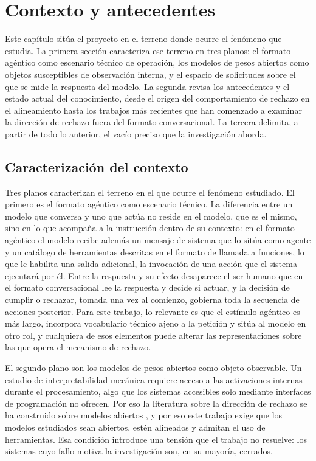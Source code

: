 \chapter{Contexto y antecedentes}
\label{chap:contexto-antecedentes}

Este capítulo sitúa el proyecto en el terreno donde ocurre el fenómeno que
estudia. La primera sección caracteriza ese terreno en tres planos: el
formato agéntico como escenario técnico de operación, los modelos de pesos
abiertos como objetos susceptibles de observación interna, y el espacio de
solicitudes sobre el que se mide la respuesta del modelo. La segunda revisa
los antecedentes y el estado actual del conocimiento, desde el origen del
comportamiento de rechazo en el alineamiento hasta los trabajos más
recientes que han comenzado a examinar la dirección de rechazo fuera del
formato conversacional. La tercera delimita, a partir de todo lo anterior,
el vacío preciso que la investigación aborda.

\section{Caracterización del contexto}
\label{sec:contexto}

Tres planos caracterizan el terreno en el que ocurre el fenómeno estudiado. El primero es el formato agéntico como escenario técnico. La diferencia entre un modelo que conversa y uno que actúa no reside en el modelo, que es el mismo, sino en lo que acompaña a la instrucción dentro de su contexto: en el formato agéntico el modelo recibe además un mensaje de sistema que lo sitúa como agente y un catálogo de herramientas descritas en el formato de llamada a funciones, lo que le habilita una salida adicional, la invocación de una acción que el sistema ejecutará por él. Entre la respuesta y su efecto desaparece el ser humano que en el formato conversacional lee la respuesta y decide si actuar, y la decisión de cumplir o rechazar, tomada una vez al comienzo, gobierna toda la secuencia de acciones posterior. Para este trabajo, lo relevante es que el estímulo agéntico es más largo, incorpora vocabulario técnico ajeno a la petición y sitúa al modelo en otro rol, y cualquiera de esos elementos puede alterar las representaciones sobre las que opera el mecanismo de rechazo.

El segundo plano son los modelos de pesos abiertos como objeto observable. Un estudio de interpretabilidad mecánica requiere acceso a las activaciones internas durante el procesamiento, algo que los sistemas accesibles solo mediante interfaces de programación no ofrecen. Por eso la literatura sobre la dirección de rechazo se ha construido sobre modelos abiertos \parencite{arditi2024}, y por eso este trabajo exige que los modelos estudiados sean abiertos, estén alineados y admitan el uso de herramientas. Esa condición introduce una tensión que el trabajo no resuelve: los sistemas cuyo fallo motiva la investigación son, en su mayoría, cerrados.

